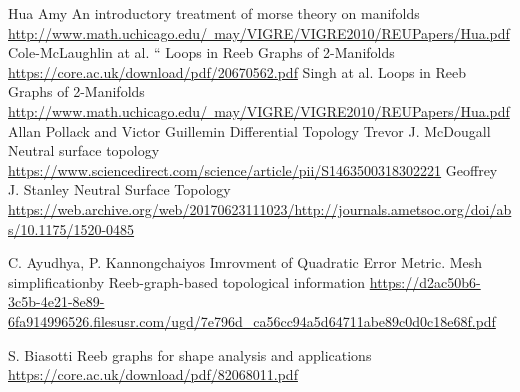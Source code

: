 \documentclass[]{article}
\begin{document}
\begin{thebibliography}{9}
     {\sc Hua Amy}
       An introductory treatment of morse theory on manifolds
       \href{http://www.math.uchicago.edu/~may/VIGRE/VIGRE2010/REUPapers/Hua.pdf}{http://www.math.uchicago.edu/~may/VIGRE/VIGRE2010/REUPapers/Hua.pdf}
     {\sc Cole-McLaughlin at al.} 
       `` Loops in Reeb Graphs of 2-Manifolds  \href{https://core.ac.uk/download/pdf/20670562.pdf}{https://core.ac.uk/download/pdf/20670562.pdf}
         {\sc Singh at al. }
          Loops in Reeb Graphs of 2-Manifolds \href{http://www.math.uchicago.edu/~may/VIGRE/VIGRE2010/REUPapers/Hua.pdf}{http://www.math.uchicago.edu/~may/VIGRE/VIGRE2010/REUPapers/Hua.pdf}
        {\sc Allan Pollack and Victor Guillemin } 
        Differential Topology
        {\sc Trevor J. McDougall}
        Neutral surface topology \href{https://www.sciencedirect.com/science/article/pii/S1463500318302221}{https://www.sciencedirect.com/science/article/pii/S1463500318302221}
        {\sc Geoffrey J. Stanley}
        Neutral Surface Topology \href{https://web.archive.org/web/20170623111023/http://journals.ametsoc.org/doi/abs/10.1175/1520-0485%281987%29017%3C1950%3ANS%3E2.0.CO%3B2}{https://web.archive.org/web/20170623111023/http://journals.ametsoc.org/doi/abs/10.1175/1520-0485}
	
	        
        {\sc C. Ayudhya, P. Kannongchaiyos}
        Imrovment of Quadratic Error Metric. Mesh simplificationby Reeb-graph-based topological information \href{https://d2ac50b6-3c5b-4e21-8e89-6fa914996526.filesusr.com/ugd/7e796d_ca56cc94a5d64711abe89c0d0c18e68f.pdf}{https://d2ac50b6-3c5b-4e21-8e89-6fa914996526.filesusr.com/ugd/7e796d_ca56cc94a5d64711abe89c0d0c18e68f.pdf}
        
        {\sc S. Biasotti}
        Reeb graphs for shape analysis and applications
 \href{https://core.ac.uk/download/pdf/82068011.pdf}{https://core.ac.uk/download/pdf/82068011.pdf}

\end{thebibliography}
\end{document}
